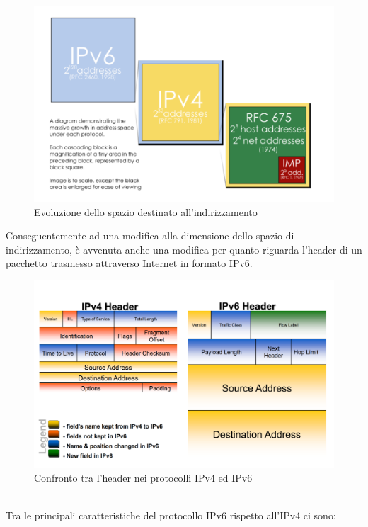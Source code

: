 \begin{figure}
	\begin{center}
		\includegraphics[width=0.9\columnwidth]{images/slide_ipv4_ipv6.png}
	\end{center}
	\caption{Evoluzione dello spazio destinato all'indirizzamento \cite{book:slide_Grieco}}
	\label{fig:slide_ipv4_ipv6}
\end{figure}
Conseguentemente ad una modifica alla dimensione dello spazio di indirizzamento, è avvenuta anche una modifica per quanto riguarda l'header di un pacchetto trasmesso attraverso Internet in formato IPv6.
\begin{figure}
	\begin{center}
		\includegraphics[width=0.9\columnwidth]{images/slide_header_ipv4_ipv6.png}
	\end{center}
	\caption{Confronto tra l'header nei protocolli IPv4 ed IPv6 \cite{book:slide_Grieco}}
	\label{fig:slide_header_ipv4_ipv6}
\end{figure}
\\Tra le principali caratteristiche del protocollo IPv6 rispetto all'IPv4 ci sono: \cite{book:slide_Grieco} \cite{book:ref_book_1}
